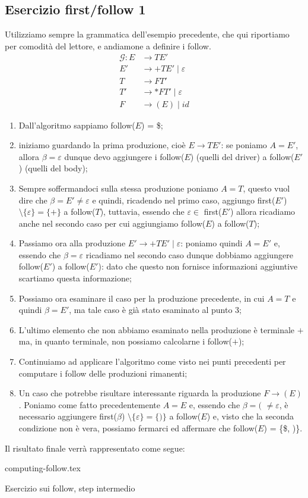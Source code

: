 \documentclass[class=book, crop=false, oneside, 12pt]{standalone}
\begin{document}
\subsection{Esercizio first/follow 1}
Utilizziamo sempre la grammatica dell'esempio precedente, che qui riportiamo per comodità del lettore, e andiamone a definire i follow.
\begin{align*}
    \mathcal{G}: E &\rightarrow TE' \\
    E' &\rightarrow +TE' \mid \varepsilon \\
    T &\rightarrow FT' \\
    T' &\rightarrow *FT' \mid \varepsilon\\
    F &\rightarrow (E) \mid id
\end{align*}
\begin{enumerate}
    \item Dall'algoritmo sappiamo follow(\(E\)) = \$;
    \item iniziamo guardando la prima produzione, cioè \(E \rightarrow TE'\): se poniamo \(A = E'\), allora \(\beta = \varepsilon\) dunque devo aggiungere i follow(\(E\)) (quelli del driver) a follow(\(E'\)) (quelli del body);
    \item Sempre soffermandoci sulla stessa produzione poniamo \(A = T\), questo vuol dire che \(\beta = E' \neq \varepsilon\) e quindi, ricadendo nel primo caso, aggiungo first(\(E'\)) \(\setminus \{\varepsilon\} = \{+\}\) a follow(\(T\)), tuttavia, essendo che \(\varepsilon \in\) first(\(E'\)) allora ricadiamo anche nel secondo caso per cui aggiungiamo follow(\(E\)) a follow(\(T\));
    \item Passiamo ora alla produzione \(E' \rightarrow +TE' \mid \varepsilon\): poniamo quindi \(A = E'\) e, essendo che \(\beta = \varepsilon\) ricadiamo nel secondo caso dunque dobbiamo aggiungere follow(\(E'\)) a follow(\(E'\)): dato che questo non fornisce informazioni aggiuntive scartiamo questa informazione;
    \item Possiamo ora esaminare il caso per la produzione precedente, in cui \(A = T\) e quindi \(\beta = E'\), ma tale caso è già stato esaminato al punto 3;
    \item L'ultimo elemento che non abbiamo esaminato nella produzione è terminale \(+\) ma, in quanto terminale, non possiamo calcolarne i follow(\(+\));
    \item Continuiamo ad applicare l'algoritmo come visto nei punti precedenti per computare i follow delle produzioni rimanenti;
    \item Un caso che potrebbe risultare interessante riguarda la produzione \(F \rightarrow (E)\). Poniamo come fatto precedentemente \(A = E\) e, essendo che \(\beta = (\) \(\neq \varepsilon\), è necessario aggiungere first(\(\beta\)) \(\setminus \{\varepsilon\} = \{)\}\) a follow(\(E\)) e, visto che la seconda condizione non è vera, possiamo fermarci ed affermare che follow(\(E\)) = \{\$, )\}.
\end{enumerate}
Il risultato finale verrà rappresentato come segue:
\begin{table}[H]
	\centering
	{computing-follow.tex}
    \caption{Esercizio sui follow, step intermedio}
    \label{computing-follow}
\end{table}
\end{document}
